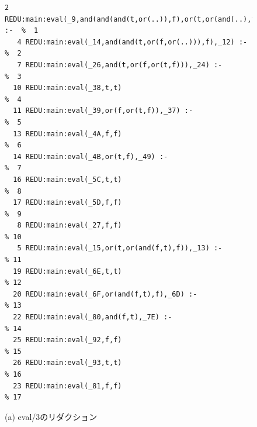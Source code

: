 \documentclass[a4,titlepage]{jsreport}
\begin{document}
\begin{figure}
\begin{center}
\begin{Verbatim}[baselinestretch=0.8]
   2 REDU:main:eval(_9,and(and(and(t,or(..)),f),or(t,or(and(..),f))),_3) :-  %  1
   4 REDU:main:eval(_14,and(and(t,or(f,or(..))),f),_12) :-                   %  2
   7 REDU:main:eval(_26,and(t,or(f,or(t,f))),_24) :-                         %  3
  10 REDU:main:eval(_38,t,t)                                                 %  4
  11 REDU:main:eval(_39,or(f,or(t,f)),_37) :-                                %  5
  13 REDU:main:eval(_4A,f,f)                                                 %  6
  14 REDU:main:eval(_4B,or(t,f),_49) :-                                      %  7
  16 REDU:main:eval(_5C,t,t)                                                 %  8
  17 REDU:main:eval(_5D,f,f)                                                 %  9
   8 REDU:main:eval(_27,f,f)                                                 % 10
   5 REDU:main:eval(_15,or(t,or(and(f,t),f)),_13) :-                         % 11
  19 REDU:main:eval(_6E,t,t)                                                 % 12
  20 REDU:main:eval(_6F,or(and(f,t),f),_6D) :-                               % 13
  22 REDU:main:eval(_80,and(f,t),_7E) :-                                     % 14
  25 REDU:main:eval(_92,f,f)                                                 % 15
  26 REDU:main:eval(_93,t,t)                                                 % 16
  23 REDU:main:eval(_81,f,f)                                                 % 17

\end{Verbatim}

(a) eval/3のリダクション\\
\vspace{8mm}


\end{center}
\end{figure}
\end{document}
